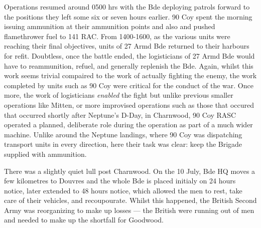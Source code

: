\documentclass[noraggedright]{turabian-researchpaper}
\begin{document}
Operations resumed around 0500 hrs with the Bde deploying patrols forward to 
the positions they left some six or seven hours earlier.\autocite[9 July 1944]
{1318wd}  90 Coy spent the morning issuing ammunition at their ammunition 
points and also and pushed flamethrower fuel to 141 RAC.  
From 1400-1600, as the various units were reaching their final objectives, 
units of 27 Armd Bde returned to their harbours for refit.  Doubtless, once 
the battle ended, the logisticians of 27 Armd Bde would have to reammunition, 
refuel, and generally replenish the Bde.\autocite[9 July 1944]{90wd}  Again,
whilst this work seems trivial compaired to the work of actually fighting
the enemy, the work completed by units such as 90 Coy were critical for the
conduct of the war.  Once more, the work of logisticians \textit{enabled} the 
fight but unlike previous smaller operations like Mitten, or more improvised
operations such as those that occured that occurred shortly after Neptune's 
D-Day, in Charnwood, 90 Coy RASC operated a planned, deliberate role during
the operation as part of a much wider machine.  Unlike around the Neptune
landings, where 90 Coy was dispatching transport units in every direction,
here their task was clear:  keep the Brigade supplied with ammunition.

There was a slightly quiet lull post Charnwood.  On the 10 July, Bde
HQ moves a few kilometres to Douvres and the whole Bde is placed initialy on 
24 hours notice, later extended to 48 hours notice, which allowed the men to 
rest, take care of their vehicles, and recoupourate.\autocite[10, 13 July 1944]
{27wd}  
Whilst this happened, the British Second Army was reorganizing to make up 
losses --- the British were running out of men and needed to make up the 
shortfall for Goodwood.







\end{document}
